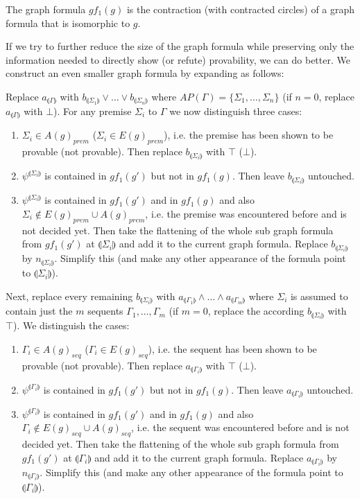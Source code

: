 \documentclass{llncs}
\newcommand{\ind}[1]{\llparenthesis #1 \rrparenthesis}
\begin{document}
\begin{example} The graph formula $gf_1(g)$ is the contraction (with contracted circles) of a graph formula that is isomorphic to $g$.
\end{example}

If we try to further reduce the size of the graph formula while preserving only the information needed to
directly show (or refute) provability, we can do better. We construct an even smaller graph formula by
expanding as follows:

Replace $a_{\ind{\Gamma}}$ with $b_{\ind{\Sigma_1}}\vee\ldots\vee b_{\ind{\Sigma_n}}$ where
$AP(\Gamma)=\{\Sigma_1,\ldots,\Sigma_n\}$ (if $n=0$, replace $a_{\ind{\Gamma}}$ with $\bot$).
For any premise $\Sigma_i$ to $\Gamma$ we now distinguish three cases:

\begin{enumerate}
\item $\Sigma_i\in A(g)_{prem}$ ($\Sigma_i\in E(g)_{prem}$), i.e. the premise has been shown to be provable (not provable). Then replace
$b_{\ind{\Sigma_i}}$ with $\top$ ($\bot$).
\item $\psi^{\ind{\Sigma_i}}$ is contained in $gf_1(g')$ but not in $gf_1(g)$. Then leave $b_{\ind{\Sigma_i}}$ untouched.
\item $\psi^{\ind{\Sigma_i}}$ is contained in $gf_1(g')$ and in $gf_1(g)$ and also $\Sigma_i\notin E(g)_{prem}\cup A(g)_{prem}$, i.e. the
premise was encountered before and is not decided yet. Then take the flattening of the whole sub graph formula from $gf_1(g')$
at $\ind{\Sigma_i}$ and add it to the current graph formula. Replace $b_{\ind{\Sigma_i}}$ by $n_{\ind{\Sigma_i}}$.
Simplify this (and make any other appearance of the formula point to $\ind{\Sigma_i}$).
\end{enumerate}

Next, replace every remaining $b_{\ind{\Sigma_i}}$ with $a_{\ind{\Gamma_1}}\wedge\ldots\wedge a_{\ind{\Gamma_m}}$ where
$\Sigma_i$ is assumed to contain just the $m$ sequents $\Gamma_1,\ldots,\Gamma_m$ (if $m=0$, replace the
according $b_{\ind{\Sigma_i}}$ with $\top$). We distinguish the cases:

\begin{enumerate}
\item $\Gamma_i\in A(g)_{seq}$ ($\Gamma_i\in E(g)_{seq}$), i.e. the sequent has been shown to be provable (not provable). Then replace
$a_{\ind{\Gamma_i}}$ with $\top$ ($\bot$).
\item $\psi^{\ind{\Gamma_i}}$ is contained in $gf_1(g')$ but not in $gf_1(g)$. Then leave $a_{\ind{\Gamma_i}}$ untouched.
\item $\psi^{\ind{\Gamma_i}}$ is contained in $gf_1(g')$ and in $gf_1(g)$ and also $\Gamma_i\notin E(g)_{seq}\cup A(g)_{seq}$, i.e. the
sequent was encountered before and is not decided yet. Then take the flattening of the whole sub graph formula from $gf_1(g')$
at $\ind{\Gamma_i}$ and add it to the current graph formula. Replace $a_{\ind{\Gamma_i}}$ by $n_{\ind{\Gamma_i}}$. Simplify
this (and make any other appearance of the formula point to $\ind{\Gamma_i}$).
\end{enumerate}
\end{document}
